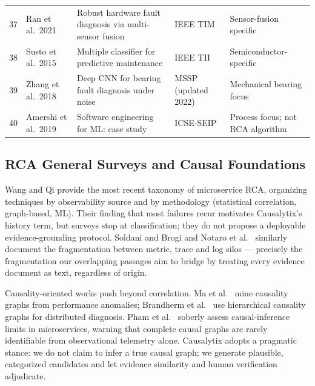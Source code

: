 \documentclass[12pt,a4paper,oneside]{report}
\begin{document}
\begin{landscape}
\begin{longtable}{p{0.6cm} p{3.2cm} p{4.2cm} p{4.2cm} p{5.5cm}}
37 & Ran et al.\ 2021 \cite{ran2021robust} & Robust hardware fault diagnosis via multi-sensor fusion & IEEE TIM & Sensor-fusion specific\\
38 & Susto et al.\ 2015 \cite{susto2015machine} & Multiple classifier for predictive maintenance & IEEE TII & Semiconductor-specific\\
39 & Zhang et al.\ 2018 \cite{zhang2022intelligent} & Deep CNN for bearing fault diagnosis under noise & MSSP (updated 2022) & Mechanical bearing focus\\
40 & Amershi et al.\ 2019 \cite{amershi2019software} & Software engineering for ML: case study & ICSE-SEIP & Process focus; not RCA algorithm\\
\bottomrule
\end{longtable}
\end{landscape}

\subsection{RCA General Surveys and Causal Foundations}
Wang and Qi \cite{wang2024comprehensive} provide the most recent taxonomy of microservice RCA, organizing techniques by observability source and by methodology (statistical correlation, graph-based, ML). Their finding that most failures recur motivates Causalytix's history term, but surveys stop at classification; they do not propose a deployable evidence-grounding protocol. Soldani and Brogi \cite{soldani2022anomaly} and Notaro et al.\ \cite{notaro2021ahead} similarly document the fragmentation between metric, trace and log silos --- precisely the fragmentation our overlapping passages aim to bridge by treating every evidence document as text, regardless of origin.

Causality-oriented works push beyond correlation. Ma et al.\ \cite{ma2020automating} mine causality graphs from performance anomalies; Brandherm et al.\ \cite{brandherm2022causeinfer} use hierarchical causality graphs for distributed diagnosis. Pham et al.\ \cite{pham2024causal} soberly assess causal-inference limits in microservices, warning that complete causal graphs are rarely identifiable from observational telemetry alone. Causalytix adopts a pragmatic stance: we do not claim to infer a true causal graph; we generate plausible, categorized candidates and let evidence similarity and human verification adjudicate.
\end{document}

